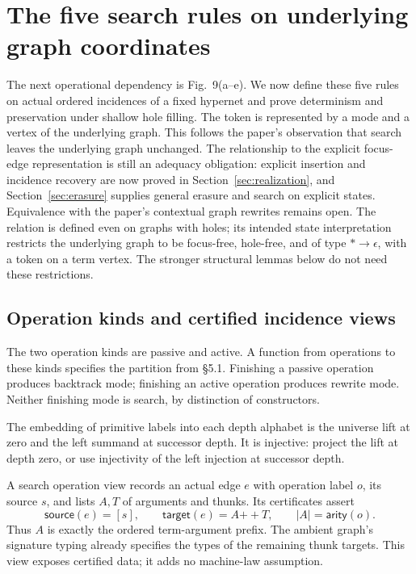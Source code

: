 \section{The five search rules on underlying graph coordinates}
\label{sec:search}

The next operational dependency is Fig.~9(a--e). We now define these five rules
on actual ordered incidences of a fixed hypernet and prove determinism and
preservation under shallow hole filling. The token is represented by a mode
and a vertex of the underlying graph. This follows the paper's observation
that search leaves the underlying graph unchanged. The relationship to the
explicit focus-edge representation is still an adequacy obligation: explicit insertion and incidence recovery are now proved in
Section~\ref{sec:realization}, and Section~\ref{sec:erasure} supplies general
erasure and search on explicit states. Equivalence with the paper's contextual
graph rewrites remains open. The relation is
defined even on graphs with holes; its intended state interpretation restricts
the underlying graph to be focus-free, hole-free, and of type $*\to\epsilon$,
with a token on a term vertex. The stronger structural lemmas below do not
need these restrictions.

\subsection{Operation kinds and certified incidence views}
\begin{definition}\label{term:operation-kind}
The two operation kinds are passive and active. A function from operations to
these kinds specifies the partition from \S5.1. Finishing a passive operation
produces backtrack mode; finishing an active operation produces rewrite mode.
Neither finishing mode is search, by distinction of constructors.
\end{definition}
The embedding of primitive labels into each depth alphabet is the universe lift
at zero and the left summand at successor depth. It is injective: project the
lift at depth zero, or use injectivity of the left injection at successor depth.

\begin{definition}\label{term:search-operation}
A search operation view records an actual edge $e$ with operation label $o$,
its source $s$, and lists $A,T$ of arguments and thunks. Its certificates assert
\[
 \mathsf{source}(e)=[s],\qquad
 \mathsf{target}(e)=A\mathbin{+\!+}T,\qquad
 |A|=\mathsf{arity}(o).
\]
Thus $A$ is exactly the ordered term-argument prefix. The ambient graph's
signature typing already specifies the types of the remaining thunk targets.
This view exposes certified data; it adds no machine-law assumption.
\end{definition}

